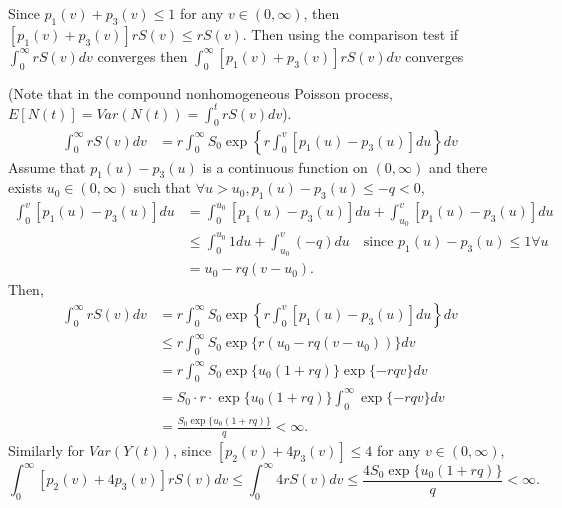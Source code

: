 \documentclass[10pt]{article}
\begin{document}
Since $p_1(v) + p_3(v) \leq 1$ for any $v \in (0, \infty)$, then $[p_1(v)+p_3(v)] r S(v) \leq rS(v)$. Then using the comparison test if $\int_0^\infty r S(v) dv$ converges then $\int_0^\infty [p_1(v)+p_3(v)] r S(v) dv$ converges

(Note that in the compound nonhomogeneous Poisson process, $E[N(t)] = Var(N(t)) = \int_0^t r S(v) dv$).
\begin{equation}
\begin{split}
\int_0^\infty r S(v) dv & = r \int_0^\infty S_0 \exp \left\{ r \int_0^v [p_1(u) - p_3(u)] du \right\} dv
\end{split}
\end{equation}
Assume that $p_1(u) - p_3(u)$ is a continuous function on $(0, \infty)$ and there exists $u_0 \in (0, \infty)$ such that $\forall u>u_0, p_1(u) - p_3(u) \leq -q < 0$,
\begin{equation}
\begin{split}
\int_0^v [p_1(u) - p_3(u)] du  &= \int_0^{u_0}  [p_1(u) - p_3(u)] du  + \int_{u_0}^{v}  [p_1(u) - p_3(u)] du  \\
& \leq  \int_0^{u_0}  1 du + \int_{u_0}^{v} (-q) du  \quad \text{since $p_1(u)-p_3(u) \leq 1 \forall u$} \\
& = u_0 - rq(v-u_0).
\end{split}
\end{equation}
Then,
\begin{equation}
\begin{split}
\int_0^\infty r S(v) dv & = r \int_0^\infty S_0 \exp \left\{ r \int_0^v [p_1(u) - p_3(u)] du \right\} dv \\
& \leq r \int_0^\infty S_0 \exp \{r ( u_0 - rq(v-u_0))\} dv \\
& = r \int_0^\infty S_0 \exp\{u_0 (1+rq)\} \exp\{-rqv\}dv \\
& = S_0 \cdot r \cdot \exp\{u_0 (1+rq)\} \int_0^\infty\exp\{-rqv\}dv \\
& = \frac{S_0 \exp\{u_0 (1+rq)\}}{q} < \infty.
\end{split}
\end{equation}
Similarly for $Var(Y(t))$, since $[p_2(v) + 4p_3(v)] \leq 4$ for any $v \in (0, \infty)$,
$$ \int_0^\infty [p_2(v) + 4p_3(v)] r S(v) dv \leq \int_0^\infty 4 r S(v) dv  \leq \frac{4 S_0 \exp\{u_0 (1+rq)\}}{q} < \infty.$$
\end{document}
